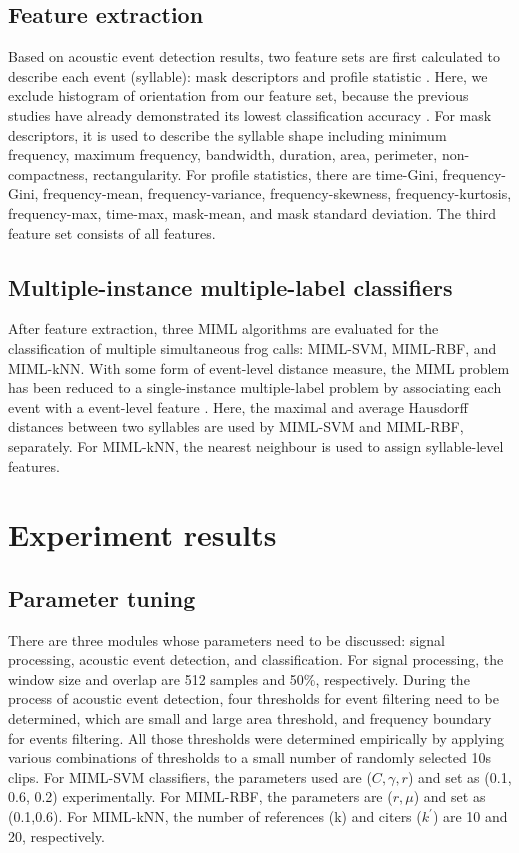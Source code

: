\subsection{Feature extraction}
Based on acoustic event detection results, two feature sets are first calculated to describe each event (syllable): mask descriptors and profile statistic \cite{briggs2012acoustic}. Here, we exclude histogram of orientation from our feature set, because the previous studies have already demonstrated its lowest classification accuracy \cite{briggs2012acoustic, ruizmultiple2015}. For mask descriptors, it is used to describe the syllable shape including minimum frequency, maximum frequency, bandwidth, duration, area, perimeter, non-compactness, rectangularity. For profile statistics, there are time-Gini, frequency-Gini, frequency-mean, frequency-variance, frequency-skewness, frequency-kurtosis, frequency-max, time-max, mask-mean, and mask standard deviation. The third feature set consists of all features.







\subsection{Multiple-instance multiple-label classifiers}
After feature extraction, three MIML algorithms are evaluated for the classification of multiple  simultaneous frog calls: MIML-SVM, MIML-RBF, and MIML-kNN. With some form of event-level distance measure, the MIML problem has been reduced to a single-instance multiple-label problem by associating each event with a event-level feature \cite{briggs2012acoustic}. Here, the maximal and average Hausdorff distances between two syllables are used by MIML-SVM and MIML-RBF, separately. For MIML-kNN, the nearest neighbour is used to assign syllable-level features. 


\section{Experiment results}

\subsection{Parameter tuning}
There are three modules whose parameters need to be discussed: signal processing, acoustic event detection, and classification. For signal processing, the window size and overlap are 512 samples and 50\%, respectively. During the process of acoustic event detection, four thresholds for event filtering need to be determined, which are small and large area threshold, and frequency boundary for events filtering. All those thresholds were determined empirically by applying various combinations of thresholds to a small number of randomly selected 10s clips. For MIML-SVM classifiers, the parameters used are ($C,\gamma,r$) and set as (0.1, 0.6, 0.2) experimentally. For MIML-RBF, the parameters are ($ r, \mu$) and set as (0.1,0.6). For MIML-kNN, the number of references (k) and citers ($k^{'}$) are 10 and 20, respectively.
 
